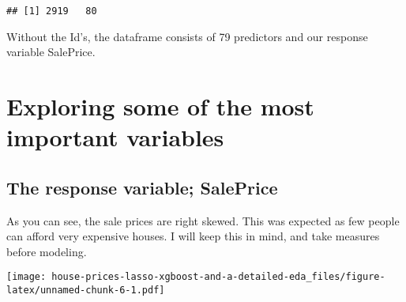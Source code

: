 \documentclass[]{article}
\newenvironment{Shaded}{\begin{snugshade}}{\end{snugshade}}
\newcommand{\KeywordTok}[1]{\textcolor[rgb]{0.13,0.29,0.53}{\textbf{#1}}}
\newcommand{\DataTypeTok}[1]{\textcolor[rgb]{0.13,0.29,0.53}{#1}}
\newcommand{\DecValTok}[1]{\textcolor[rgb]{0.00,0.00,0.81}{#1}}
\newcommand{\StringTok}[1]{\textcolor[rgb]{0.31,0.60,0.02}{#1}}
\newcommand{\OtherTok}[1]{\textcolor[rgb]{0.56,0.35,0.01}{#1}}
\newcommand{\OperatorTok}[1]{\textcolor[rgb]{0.81,0.36,0.00}{\textbf{#1}}}
\newcommand{\NormalTok}[1]{#1}
\begin{document}
\begin{Shaded}
\end{Shaded}

\begin{verbatim}
## [1] 2919   80
\end{verbatim}

Without the Id's, the dataframe consists of 79 predictors and our
response variable SalePrice.

\section{Exploring some of the most important
variables}\label{exploring-some-of-the-most-important-variables}

\subsection{The response variable;
SalePrice}\label{the-response-variable-saleprice}

As you can see, the sale prices are right skewed. This was expected as
few people can afford very expensive houses. I will keep this in mind,
and take measures before modeling.

\begin{Shaded}
\end{Shaded}

\texttt{[image: house-prices-lasso-xgboost-and-a-detailed-eda\_files/figure-latex/unnamed-chunk-6-1.pdf]}
\end{document}

